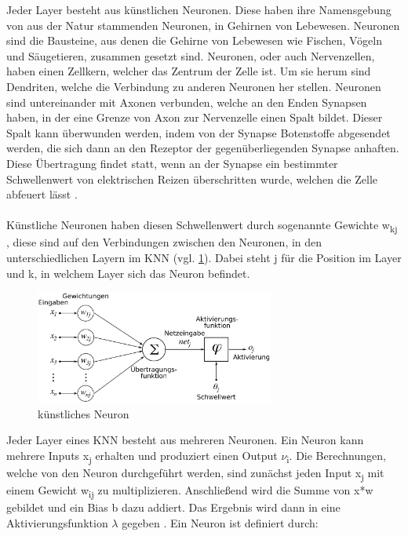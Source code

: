 \documentclass{llncs}
\begin{document}
Jeder Layer besteht aus künstlichen Neuronen. Diese haben ihre Namensgebung von aus der Natur stammenden Neuronen, in Gehirnen von Lebewesen. Neuronen sind die Bausteine, aus denen die Gehirne von Lebewesen wie Fischen, Vögeln und Säugetieren, zusammen gesetzt sind. Neuronen, oder auch Nervenzellen, haben einen Zellkern, welcher das Zentrum der Zelle ist. Um sie herum sind Dendriten, welche die Verbindung zu anderen Neuronen her stellen. Neuronen sind untereinander mit Axonen verbunden, welche an den Enden Synapsen haben, in der eine Grenze von Axon zur Nervenzelle einen Spalt bildet. Dieser Spalt kann überwunden werden, indem von der Synapse Botenstoffe abgesendet werden, die sich dann an den Rezeptor der gegenüberliegenden Synapse anhaften. Diese Übertragung findet statt, wenn an der Synapse ein bestimmter Schwellenwert von elektrischen Reizen überschritten wurde, welchen die Zelle abfeuert lässt \cite{neuralnet}.
\\\\
Künstliche Neuronen haben diesen Schwellenwert durch sogenannte Gewichte w\textsubscript{kj} , diese sind auf den Verbindungen zwischen den Neuronen, in den unterschiedlichen Layern im KNN (vgl. \ref{fig:Bild2}). Dabei steht j für die Position im Layer und k, in welchem Layer sich das Neuron befindet.
\begin{figure}[htbp] 
	\centering
	\includegraphics[width=0.7\textwidth]{Neuron.png}
	\caption{künstliches Neuron}
	\label{fig:Bild2}
\end{figure}
Jeder Layer eines KNN besteht aus mehreren Neuronen. Ein Neuron kann mehrere Inputs x\textsubscript{j} erhalten und produziert einen Output $\nu$\textsubscript{i}. Die Berechnungen, welche von den Neuron durchgeführt werden, sind zunächst jeden Input x\textsubscript{j} mit einem Gewicht w\textsubscript{ij} zu multiplizieren. Anschließend wird die Summe von x*w gebildet und ein Bias b dazu addiert. Das Ergebnis wird dann in eine Aktivierungsfunktion $\lambda$ gegeben \cite{neuralnet}. Ein Neuron ist definiert durch:
\\\\
\end{document}
